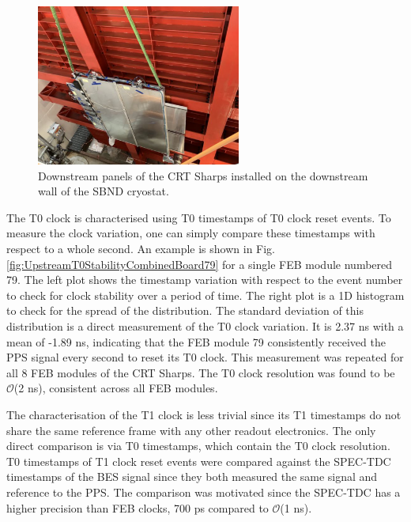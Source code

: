 \begin{figure}[htbp!] 
\centering    
\includegraphics[width=0.6\textwidth]{crt_sharps}
\caption[CRT Sharps Setup]{
Downstream panels of the CRT Sharps installed on the downstream wall of the SBND cryostat. 
}
\label{fig:crtSharps}
\end{figure}


The T0 clock is characterised using T0 timestamps of T0 clock reset events.
To measure the clock variation, one can simply compare these timestamps with respect to a whole second.
An example is shown in Fig. \ref{fig:UpstreamT0StabilityCombinedBoard79} for a single FEB module numbered 79.
The left plot shows the timestamp variation with respect to the event number to check for clock stability over a period of time.
The right plot is a 1D histogram to check for the spread of the distribution.
The standard deviation of this distribution is a direct measurement of the T0 clock variation.
It is 2.37 ns with a mean of -1.89 ns, indicating that the FEB module 79 consistently received the PPS signal every second to reset its T0 clock.
This measurement was repeated for all 8 FEB modules of the CRT Sharps.
The T0 clock resolution was found to be $\mathcal{O}$(2 ns), consistent across all FEB modules.

The characterisation of the T1 clock is less trivial since its T1 timestamps do not share the same reference frame with any other readout electronics.
The only direct comparison is via T0 timestamps, which contain the T0 clock resolution. 
T0 timestamps of T1 clock reset events were compared against the SPEC-TDC timestamps of the BES signal since they both measured the same signal and reference to the PPS.
The comparison was motivated since the SPEC-TDC has a higher precision than FEB clocks, 700 ps compared to $\mathcal{O}$(1 ns).

